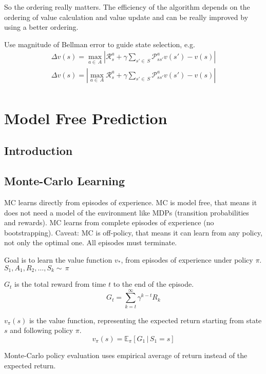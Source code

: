 \begin{itemize}
So the ordering really matters.
The efficiency of the algorithm depends on the ordering of value calculation and value update
and can be really improved by using a better ordering.

Use magnitude of Bellman error to guide state selection, e.g.
\begin{gather*}
    \Delta v(s) = \max_{a\in\,A}\left|\mathcal{R}_{s}^{a} + \gamma\sum_{s'\in\,S}\mathcal{P}_{ss'}^{a}v(s') - v(s)\right|\\
    \Delta v(s) = \left|\max_{a\in\,A}\mathcal{R}_{s}^{a} + \gamma\sum_{s'\in\,S}\mathcal{P}_{ss'}^{a}v(s') - v(s)\right|\\
\end{gather*}


\section{Model Free Prediction}\label{sec:model-free-prediction}

\subsection{Introduction}\label{subsec:introduction}

\subsection{Monte-Carlo Learning}\label{subsec:monte-carlo-learning}
MC learns directly from episodes of experience.
MC is model free, that means it does not need a model of the environment
like MDPs (transition probabilities and rewards).
MC learns from complete episodes of experience (no bootstrapping).
Caveat: MC is off-policy, that means it can learn from any policy, not only the optimal one. %
All episodes must terminate.

Goal is to learn the value function $v_*$, from episodes of experience under policy $\pi$.
$S_1, A_1, R_2, \ldots, S_k \sim\,\pi$

$G_t$ is the total reward from time $t$ to the end of the episode.
\[
    G_t = \sum_{k=t}^{\infty}\gamma^{k-t}R_k
\]

$v_{\pi}(s)$ is the value function, representing the expected return starting from
state $s$ and following policy $\pi$.
\[
    v_{\pi}(s) = \mathbb{E}_{\pi}\left[G_1\,\bigg|\,S_1=s\right]
\]

Monte-Carlo policy evaluation uses empirical average of return
instead of the expected return. %


\end{itemize}

